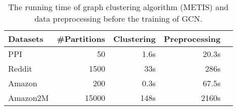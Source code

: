 \documentclass[sigconf]{acmart}
\begin{document}
\begin{table}
\centering
      \caption{The running time of graph clustering algorithm (METIS) and data preprocessing before the training of GCN.}
      \label{tab:clustering}
    \begin{tabular}{|l|r|r|r|r|}
    \hline
    Datasets & \#Partitions & Clustering & Preprocessing \\
     \hline
     PPI  & 50 & 1.6s & 20.3s \\
     \hline
     Reddit  & 1500 & 33s & 286s \\
     \hline
     Amazon & 200 & 0.3s & 67.5s \\
     \hline
  Amazon2M & 15000 & 148s & 2160s \\
  \hline
    \end{tabular}
  \end{table}
\end{document}
